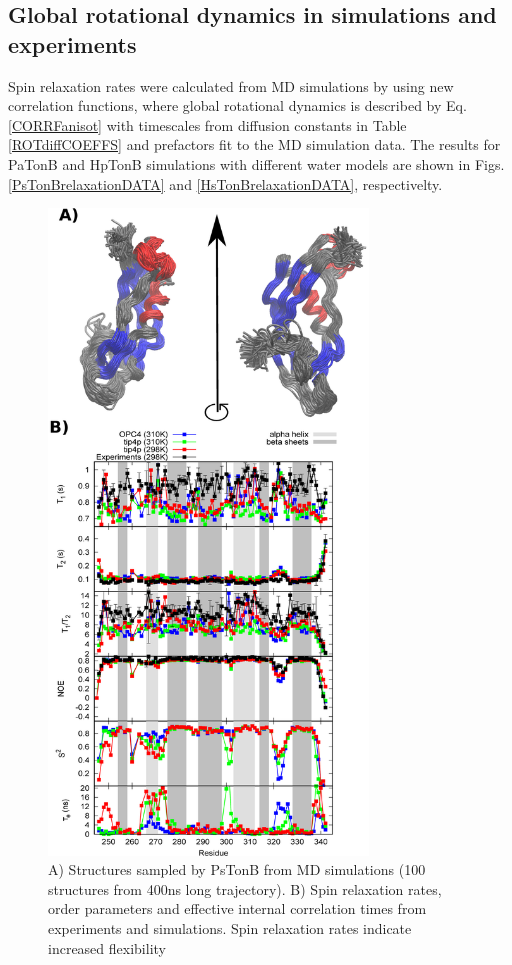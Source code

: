 \documentclass[pre,aps,floatfix,authordate1-4,twocolumn]{revtex4-1}
\begin{document}
\subsection{Global rotational dynamics in simulations and experiments}
Spin relaxation rates were calculated from MD simulations by using new correlation
functions, where global rotational dynamics is described by Eq. \ref{CORRFanisot}
with timescales from diffusion constants in Table \ref{ROTdiffCOEFFS} and prefactors
fit to the MD simulation data. The results for PaTonB and HpTonB simulations with different
water models are shown in Figs. \ref{PsTonBrelaxationDATA} and \ref{HsTonBrelaxationDATA},
respectivelty. 
\begin{figure}[!h]
  \includegraphics[width=8.5cm]{../Figs/RELdataPsTonB.eps}%
  \caption{A) Structures sampled by PsTonB from MD simulations
    (100 structures from 400ns long trajectory).
    B) Spin relaxation rates, order parameters and effective internal correlation
    times from experiments and simulations. Spin relaxation rates indicate increased flexibility
}
\end{figure}
\end{document}
